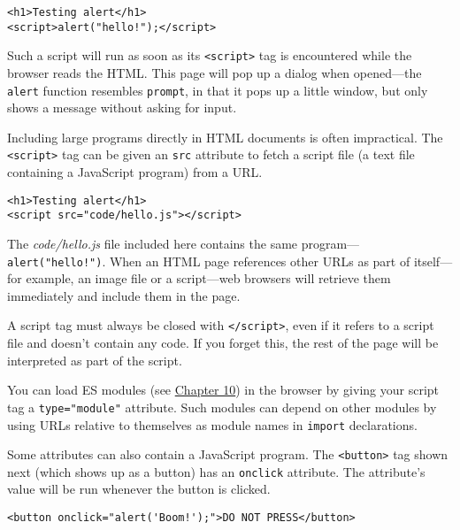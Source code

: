 \begin{lstlisting}
<h1>Testing alert</h1>
<script>alert("hello!");</script>
\end{lstlisting}
\noindent{}

Such a script will run as soon as its \lstinline`<script>` tag is encountered while the browser reads the HTML. This page will pop up a dialog when opened—the \lstinline`alert` function resembles \lstinline`prompt`, in that it pops up a little window, but only shows a message without asking for input.

Including large programs directly in HTML documents is often impractical. The \lstinline`<script>` tag can be given an \lstinline`src` attribute  to fetch a script file (a text file containing a JavaScript program) from a URL.

\begin{lstlisting}
<h1>Testing alert</h1>
<script src="code/hello.js"></script>
\end{lstlisting}
\noindent

The \emph{code\slash hello.js} file included here contains the same program—\lstinline`alert("hello!")`. When an HTML page references other URLs as part of itself—for example, an image file or a script—web browsers will retrieve them immediately and include them in the page.

A script tag must always be closed with \lstinline`</script>`, even if it refers to a script file and doesn't contain any code. If you forget this, the rest of the page will be interpreted as part of the script.

You can load ES modules (see \hyperref[modules.es]{Chapter 10}) in the browser by giving your script tag a \lstinline`type="module"` attribute. Such modules can depend on other modules by using URLs relative to themselves as module names in \lstinline`import` declarations.

Some attributes can also contain a JavaScript program. The \lstinline`<button>` tag shown next (which shows up as a button) has an \lstinline`onclick` attribute. The attribute's value will be run whenever the button is clicked.

\begin{lstlisting}
<button onclick="alert('Boom!');">DO NOT PRESS</button>
\end{lstlisting}
\noindent{}

